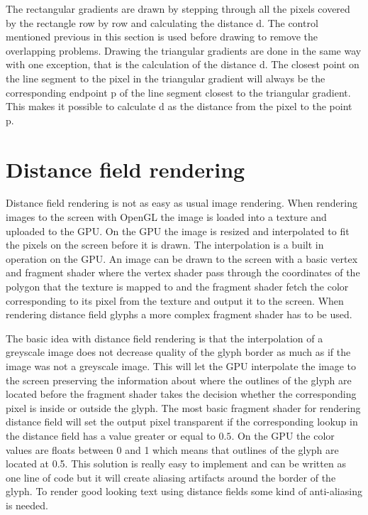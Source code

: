 The rectangular gradients are drawn by stepping through all the pixels covered by the rectangle row by row and calculating the distance d. The control mentioned previous in this section is used before drawing to remove the overlapping problems. Drawing the triangular gradients are done in the same way with one exception, that is the calculation of the distance d. The closest point on the line segment to the pixel in the triangular gradient will always be the corresponding endpoint p of the line segment closest to the triangular gradient. This makes it possible to calculate d as the distance from the pixel to the point p.

\section{Distance field rendering}
Distance field rendering is not as easy as usual image rendering. When rendering images to the screen with OpenGL the image is loaded into a texture and uploaded to the GPU. On the GPU the image is resized and interpolated to fit the pixels on the screen before it is drawn. The interpolation is a built in operation on the GPU. An image can be drawn to the screen with a basic vertex and fragment shader where the vertex shader pass through the coordinates of the polygon that the texture is mapped to and the fragment shader fetch the color corresponding to its pixel from the texture and output it to the screen. When rendering distance field glyphs a more complex fragment shader has to be used.

The basic idea with distance field rendering is that the interpolation of a greyscale image does not decrease quality of the glyph border as much as if the image was not a greyscale image. This will let the GPU interpolate the image to the screen preserving the information about where the outlines of the glyph are located before the fragment shader takes the decision whether the corresponding pixel is inside or outside the glyph. The most basic fragment shader for rendering distance field will set the output pixel transparent if the corresponding lookup in the distance field has a value greater or equal to $0.5$. On the GPU the color values are floats between 0 and 1 which means that outlines of the glyph are located at 0.5. This solution is really easy to implement and can be written as one line of code but it will create aliasing artifacts around the border of the glyph. To render good looking text using distance fields some kind of anti-aliasing is needed. 

